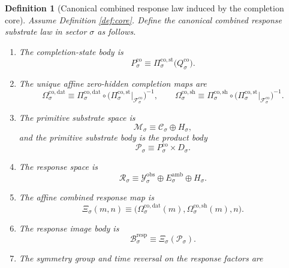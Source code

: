 \documentclass[11pt]{article}
\newcommand{\DataSpace}[1]{\mathcal Y_{#1}^{\mathrm{obs}}}
\newcommand{\AmbientTarget}[1]{E_{#1}^{\mathrm{amb}}}
\newcommand{\ProtoSpace}[1]{\mathcal M_{#1}}
\newcommand{\ProtoBody}[1]{\mathcal P_{#1}}
\newcommand{\ResponseSpace}[1]{\mathcal R_{#1}}
\newcommand{\ResponseMap}[1]{\Xi_{#1}}
\newcommand{\ResponseImage}[1]{\mathcal B_{#1}^{\mathrm{resp}}}
\newcommand{\GapSpace}[1]{H_{#1}}
\newcommand{\GapBody}[1]{D_{#1}}
\newcommand{\CoreState}[1]{\mathcal C_{#1}}
\newcommand{\CoreAffine}[1]{\mathcal F_{#1}^{\mathrm{co}}}
\newcommand{\CoreBody}[1]{Q_{#1}^{\mathrm{co}}}
\newcommand{\CoreStateBody}[1]{P_{#1}^{\mathrm{co}}}
\newcommand{\CoreStateProj}[1]{\Pi_{#1}^{\mathrm{co,st}}}
\newcommand{\CoreDataProj}[1]{\Pi_{#1}^{\mathrm{co,dat}}}
\newcommand{\CoreShellProj}[1]{\Pi_{#1}^{\mathrm{co,sh}}}
\newcommand{\CoreDataMap}[1]{\Omega_{#1}^{\mathrm{co,dat}}}
\newcommand{\CoreShellMap}[1]{\Omega_{#1}^{\mathrm{co,sh}}}
\newtheorem{definition}{Definition}
\begin{document}
\begin{definition}[Canonical combined response law induced by the completion core]
\label{def:canonical}
Assume Definition \ref{def:core}. Define the canonical combined response substrate law in sector \(\sigma\) as follows.
\begin{enumerate}
    \item The completion-state body is
    \begin{equation}
    \CoreStateBody{\sigma}
    \equiv
    \CoreStateProj{\sigma}\bigl(\CoreBody{\sigma}\bigr).
    \label{eq:corestatebody}
    \end{equation}
    \item The unique affine zero-hidden completion maps are
    \begin{equation}
    \CoreDataMap{\sigma}
    \equiv
    \CoreDataProj{\sigma}\circ
    \bigl(
    \CoreStateProj{\sigma}\big|_{\CoreAffine{\sigma}}
    \bigr)^{-1},
    \qquad
    \CoreShellMap{\sigma}
    \equiv
    \CoreShellProj{\sigma}\circ
    \bigl(
    \CoreStateProj{\sigma}\big|_{\CoreAffine{\sigma}}
    \bigr)^{-1}.
    \label{eq:coremaps}
    \end{equation}
    \item The primitive substrate space is
    \[
    \ProtoSpace{\sigma}
    \equiv
    \CoreState{\sigma}\oplus \GapSpace{\sigma},
    \]
    and the primitive substrate body is the product body
    \begin{equation}
    \ProtoBody{\sigma}
    \equiv
    \CoreStateBody{\sigma}\times \GapBody{\sigma}.
    \label{eq:protobody}
    \end{equation}
    \item The response space is
    \[
    \ResponseSpace{\sigma}
    \equiv
    \DataSpace{\sigma}\oplus \AmbientTarget{\sigma}\oplus \GapSpace{\sigma}.
    \]
    \item The affine combined response map is
    \begin{equation}
    \ResponseMap{\sigma}(m,n)
    \equiv
    \bigl(
    \CoreDataMap{\sigma}(m),
    \CoreShellMap{\sigma}(m),
    n
    \bigr).
    \label{eq:responsemap}
    \end{equation}
    \item The response image body is
    \begin{equation}
    \ResponseImage{\sigma}
    \equiv
    \ResponseMap{\sigma}(\ProtoBody{\sigma}).
    \label{eq:responseimage}
    \end{equation}
    \item The symmetry group and time reversal on the response factors are

\end{enumerate}
\end{definition}
\end{document}
